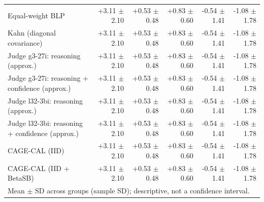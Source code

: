 \begin{tabular}{lrrrrr}
Equal-weight BLP & +3.11 {\scriptsize $\pm$ 2.10} & +0.53 {\scriptsize $\pm$ 0.48} & +0.83 {\scriptsize $\pm$ 0.60} & -0.54 {\scriptsize $\pm$ 1.41} & -1.08 {\scriptsize $\pm$ 1.78} \\
Kahn (diagonal covariance) & +3.11 {\scriptsize $\pm$ 2.10} & +0.53 {\scriptsize $\pm$ 0.48} & +0.83 {\scriptsize $\pm$ 0.60} & -0.54 {\scriptsize $\pm$ 1.41} & -1.08 {\scriptsize $\pm$ 1.78} \\
Judge g3-27i: reasoning (approx.) & +3.11 {\scriptsize $\pm$ 2.10} & +0.53 {\scriptsize $\pm$ 0.48} & +0.83 {\scriptsize $\pm$ 0.60} & -0.54 {\scriptsize $\pm$ 1.41} & -1.08 {\scriptsize $\pm$ 1.78} \\
Judge g3-27i: reasoning + confidence (approx.) & +3.11 {\scriptsize $\pm$ 2.10} & +0.53 {\scriptsize $\pm$ 0.48} & +0.83 {\scriptsize $\pm$ 0.60} & -0.54 {\scriptsize $\pm$ 1.41} & -1.08 {\scriptsize $\pm$ 1.78} \\
Judge l32-3bi: reasoning (approx.) & +3.11 {\scriptsize $\pm$ 2.10} & +0.53 {\scriptsize $\pm$ 0.48} & +0.83 {\scriptsize $\pm$ 0.60} & -0.54 {\scriptsize $\pm$ 1.41} & -1.08 {\scriptsize $\pm$ 1.78} \\
Judge l32-3bi: reasoning + confidence (approx.) & +3.11 {\scriptsize $\pm$ 2.10} & +0.53 {\scriptsize $\pm$ 0.48} & +0.83 {\scriptsize $\pm$ 0.60} & -0.54 {\scriptsize $\pm$ 1.41} & -1.08 {\scriptsize $\pm$ 1.78} \\
CAGE-CAL (IID) & +3.11 {\scriptsize $\pm$ 2.10} & +0.53 {\scriptsize $\pm$ 0.48} & +0.83 {\scriptsize $\pm$ 0.60} & -0.54 {\scriptsize $\pm$ 1.41} & -1.08 {\scriptsize $\pm$ 1.78} \\
CAGE-CAL (IID + BetaSB) & +3.11 {\scriptsize $\pm$ 2.10} & +0.53 {\scriptsize $\pm$ 0.48} & +0.83 {\scriptsize $\pm$ 0.60} & -0.54 {\scriptsize $\pm$ 1.41} & -1.08 {\scriptsize $\pm$ 1.78} \\
\bottomrule
\multicolumn{6}{l}{\scriptsize Mean $\pm$ SD across groups (sample SD); descriptive, not a confidence interval.} \\
\end{tabular}
